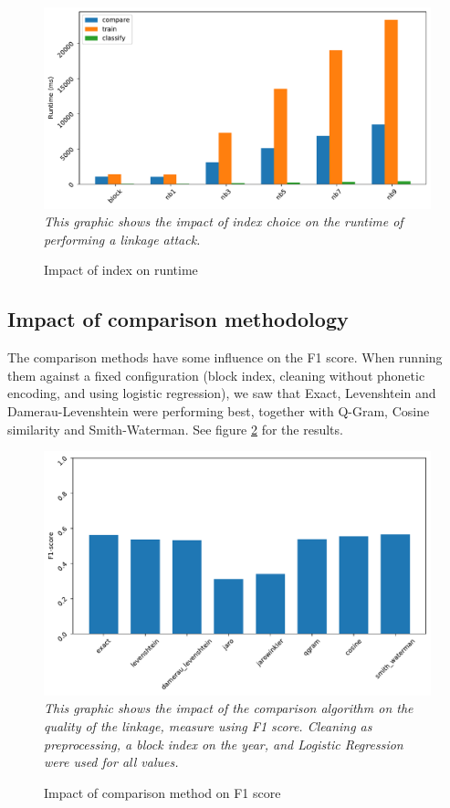 \documentclass[sigconf,nonacm]{acmart}
\begin{document}
\begin{figure}[h]
\centering
\caption{Impact of index on runtime}
\label{plot:index2}
\includegraphics[width=0.9\linewidth]{../figures/eval_indexing2}\\[-2mm]
\emph{\small
This graphic shows the impact of index choice on the runtime of performing
a linkage attack.}
\end{figure}


\subsection{Impact of comparison methodology}

The comparison methods have some influence on the F1 score.
When running them against a fixed configuration (block index,
cleaning without phonetic encoding, and using logistic regression),
we saw that Exact, Levenshtein and Damerau-Levenshtein were performing best,
together with Q-Gram, Cosine similarity and Smith-Waterman.
See figure \ref{plot:comparison} for the results.

\begin{figure}[h]
\centering
\caption{Impact of comparison method on F1 score}
\label{plot:comparison}
\includegraphics[width=0.9\linewidth]{../figures/debug_eval_comparison}\\[-2mm]
\emph{\small
This graphic shows the impact of the comparison algorithm on the
quality of the linkage, measure using F1 score.
Cleaning as preprocessing, a block index on the year,
and Logistic Regression were used for all values.}
\end{figure}
\end{document}
